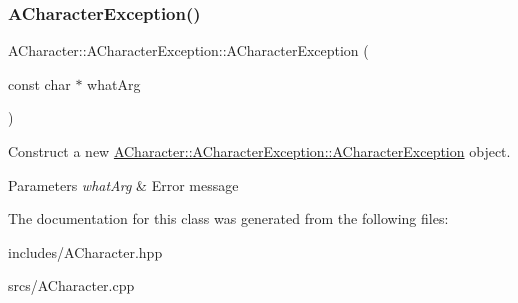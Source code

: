 \subsubsection{\texorpdfstring{A\+Character\+Exception()}{ACharacterException()}}
{\footnotesize\ttfamily A\+Character\+::\+A\+Character\+Exception\+::\+A\+Character\+Exception (\begin{DoxyParamCaption}\item[{const char $\ast$}]{what\+Arg }\end{DoxyParamCaption})\hspace{0.3cm}{\ttfamily [explicit]}}



Construct a new \hyperlink{class_a_character_1_1_a_character_exception_a1a036384dac2c6291b82e1794ea3c845}{A\+Character\+::\+A\+Character\+Exception\+::\+A\+Character\+Exception} object. 


\begin{DoxyParams}{Parameters}
{\em what\+Arg} & Error message \\
\hline
\end{DoxyParams}


The documentation for this class was generated from the following files\+:\begin{DoxyCompactItemize}
\item 
includes/A\+Character.\+hpp\item 
srcs/A\+Character.\+cpp\end{DoxyCompactItemize}
